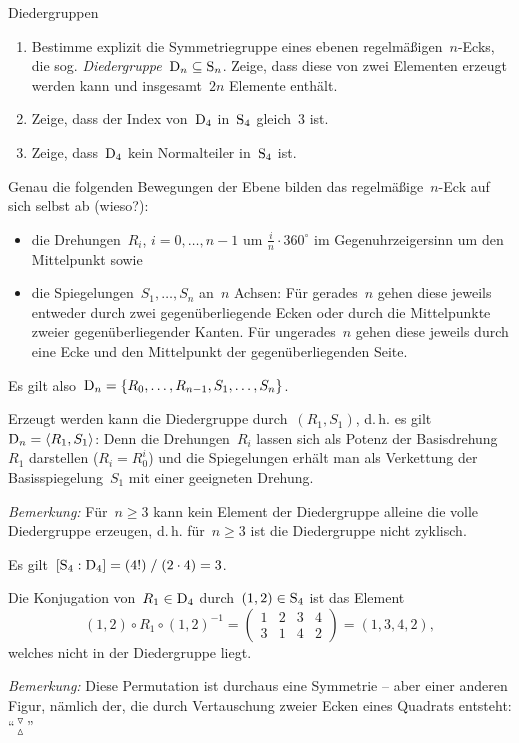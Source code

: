 \documentclass{algblatt}
\begin{document}
\begin{aufgabe}{Diedergruppen}
\begin{enumerate}
\item Bestimme explizit die Symmetriegruppe eines ebenen regelmäßigen~$n$-Ecks,
die sog. \emph{Diedergruppe~$\mathrm{D}_n \subseteq \mathrm{S}_n$}. Zeige, dass
diese von zwei Elementen erzeugt werden kann und insgesamt~$2n$ Elemente
enthält.
\item Zeige, dass der Index von~$\mathrm{D}_4$ in~$\mathrm{S}_4$ gleich~$3$ ist.
\item Zeige, dass~$\mathrm{D}_4$ kein Normalteiler in~$\mathrm{S}_4$ ist.
\end{enumerate}

\begin{loesungE}
\item Genau die folgenden Bewegungen der Ebene bilden das
regelmäßige~$n$-Eck auf sich selbst ab (wieso?):
\begin{itemize}
\item die Drehungen~$R_i$, $i = 0,\ldots,{n-1}$ um $\frac{i}{n} \cdot
360^\circ$ im Gegenuhrzeigersinn um den Mittelpunkt sowie
\item die Spiegelungen~$S_1,\ldots,S_n$ an~$n$ Achsen: Für gerades~$n$ gehen
diese jeweils entweder durch zwei gegenüberliegende Ecken oder durch die Mittelpunkte
zweier gegenüberliegender Kanten. Für ungerades~$n$ gehen diese jeweils durch
eine Ecke und den Mittelpunkt der gegenüberliegenden Seite.
\end{itemize}
Es gilt also~$\mathrm{D}_n = \{ R_0,\ldots,R_{n-1}, S_1,\ldots,S_n \}$.

Erzeugt werden kann die Diedergruppe durch~$(R_1,S_1)$, d.\,h. es
gilt~$\mathrm{D}_n = \langle R_1, S_1 \rangle$: Denn die Drehungen~$R_i$ lassen sich
als Potenz der Basisdrehung~$R_1$ darstellen ($R_i = R_0^i$) und die
Spiegelungen erhält man als Verkettung der Basisspiegelung~$S_1$ mit einer
geeigneten Drehung.

\emph{Bemerkung:} Für~$n \geq 3$ kann kein Element der Diedergruppe alleine die
volle Diedergruppe erzeugen, d.\,h. für~$n \geq 3$ ist die Diedergruppe nicht
zyklisch.

\item Es gilt~$[\mathrm{S}_4:\mathrm{D}_4] = (4!) \mathrel{/} (2\cdot4) = 3$.

\item Die Konjugation von~$R_1 \in \mathrm{D}_4$ durch~$(1,2) \in \mathrm{S}_4$ ist das
Element
\[ (1,2) \circ R_1 \circ (1,2)^{-1} =
  \begin{pmatrix}
    1 & 2 & 3 & 4 \\
    3 & 1 & 4 & 2
  \end{pmatrix} =
  (1,3,4,2), \]
welches nicht in der Diedergruppe liegt.

\emph{Bemerkung:} Diese Permutation ist durchaus eine Symmetrie -- aber einer
anderen Figur, nämlich der, die durch Vertauschung zweier Ecken eines Quadrats
entsteht: "`$\triangledown\atop\vartriangle$"'
\end{loesungE}
\end{aufgabe}
\end{document}
